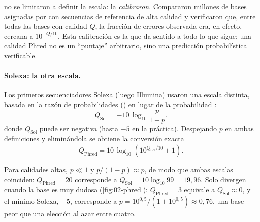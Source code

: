 \textcite{c02-ewing1998b} no se limitaron a definir la escala: la \emph{calibraron}. Compararon millones de bases asignadas por  con secuencias de referencia de alta calidad y verificaron que, entre todas las bases con calidad $Q$, la fracción de errores observada era, en efecto, cercana a $10^{-Q/10}$. Esta calibración es la que da sentido a todo lo que sigue: una calidad Phred no es un ``puntaje'' arbitrario, sino una predicción probabilística verificable.

\paragraph{Solexa: la otra escala.} Los primeros secuenciadores Solexa (luego Illumina) usaron una escala distinta, basada en la razón de probabilidades () en lugar de la probabilidad \parencite{c02-cock2010}:
\begin{equation}\label{eq:02-solexa}
Q_{\text{Sol}} = -10\,\log_{10}\frac{p}{1-p}.
\end{equation}
donde $Q_{\text{Sol}}$ puede ser negativa (hasta $-5$ en la práctica). Despejando $p$ en ambas definiciones y eliminándola se obtiene la conversión exacta
\begin{equation}\label{eq:02-conversion}
Q_{\text{Phred}} = 10\,\log_{10}\!\left(10^{Q_{\text{Sol}}/10} + 1\right).
\end{equation}
\begin{simbolos}
\end{simbolos}
Para calidades altas, $p\ll 1$ y $p/(1-p)\approx p$, de modo que ambas escalas coinciden: $Q_{\text{Phred}}=20$ corresponde a $Q_{\text{Sol}}=10\log_{10}99=19{,}96$. Solo divergen cuando la base es muy dudosa (\cref{fig:02-phred}): $Q_{\text{Phred}}=3$ equivale a $Q_{\text{Sol}}\approx 0$, y el mínimo Solexa, $-5$, corresponde a $p = 10^{0{,}5}/(1+10^{0{,}5}) \approx 0{,}76$, una base peor que una elección al azar entre cuatro.

